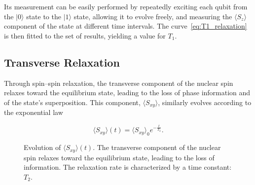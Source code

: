 Its measurement can be easily performed by repeatedly exciting each qubit from the \(\lvert 0 \rangle\) state to the \(\lvert 1 \rangle\) state, allowing it to evolve freely, and measuring the \(\langle S_z \rangle\) component of the state at different time intervals. The curve~\ref{eq:T1_relaxation} is then fitted to the set of results, yielding a value for \(T_1\).

\subsection{Transverse Relaxation}
\label{subsec:transverse_relaxation}

Through spin–spin relaxation, the transverse component of the nuclear spin relaxes toward the equilibrium state, leading to the loss of phase information and of the state’s superposition. This component, \(\langle S_{xy}\rangle\), similarly evolves according to the exponential law

\begin{equation}
    \langle S_{xy}\rangle(t)=\langle S_{xy}\rangle_0e^{-\frac{t}{T_2}}.
    \label{eq:T2_relaxation}
\end{equation}


\begin{figure}[ht]
\centering
{}

\caption{Evolution of $\langle S_{xy}\rangle(t)$. The transverse component of the nuclear spin relaxes toward the equilibrium state, leading to the loss of information. The relaxation rate is characterized by a time constant: \(T_2\).}
\label{fig:transverserelaxation}
\end{figure}

